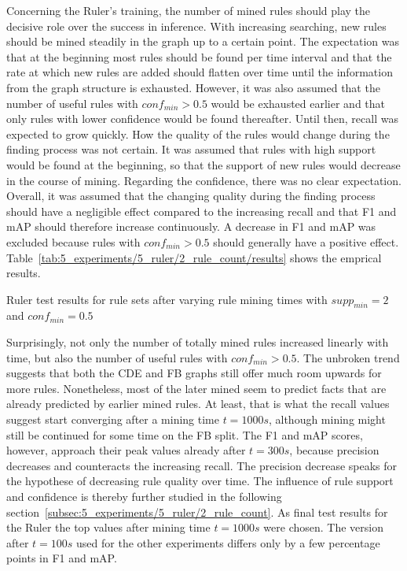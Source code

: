 Concerning the Ruler's training, the number of mined rules should play the decisive role over the success in inference. With increasing searching, new rules should be mined steadily in the graph up to a certain point. The expectation was that at the beginning most rules should be found per time interval and that the rate at which new rules are added should flatten over time until the information from the graph structure is exhausted. However, it was also assumed that the number of useful rules with $conf_{min} > 0.5$ would be exhausted earlier and that only rules with lower confidence would be found thereafter. Until then, recall was expected to grow quickly. How the quality of the rules would change during the finding process was not certain. It was assumed that rules with high support would be found at the beginning, so that the support of new rules would decrease in the course of mining. Regarding the confidence, there was no clear expectation. Overall, it was assumed that the changing quality during the finding process should have a negligible effect compared to the increasing recall and that F1 and mAP should therefore increase continuously. A decrease in F1 and mAP was excluded because rules with $conf_{min} > 0.5$ should generally have a positive effect. Table~\ref{tab:5_experiments/5_ruler/2_rule_count/results} shows the emprical results.

\begin{table}
    \centering
    
    \caption{Ruler test results for rule sets after varying rule mining times with $supp_{min} = 2$ and $conf_{min} = 0.5$}
    \label{tab:5_experiments/5_ruler/2_rule_count/results}
\end{table}

Surprisingly, not only the number of totally mined rules increased linearly with time, but also the number of useful rules with $conf_{min} > 0.5$. The unbroken trend suggests that both the CDE and FB graphs still offer much room upwards for more rules. Nonetheless, most of the later mined seem to predict facts that are already predicted by earlier mined rules. At least, that is what the recall values suggest start converging after a mining time $t = 1000s$, although mining might still be continued for some time on the FB split. The F1 and mAP scores, however, approach their peak values already after $t = 300s$, because precision decreases and counteracts the increasing recall. The precision decrease speaks for the hypothese of decreasing rule quality over time. The influence of rule support and confidence is thereby further studied in the following section~\ref{subsec:5_experiments/5_ruler/2_rule_count}. As final test results for the Ruler the top values after mining time $t = 1000s$ were chosen. The version after $t = 100s$ used for the other experiments differs only by a few percentage points in F1 and mAP.

